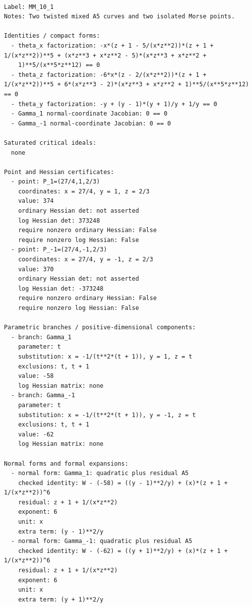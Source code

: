 \documentclass[10pt,a4paper]{article}
\begin{document}
\begin{lstlisting}

Label: MM_10_1
Notes: Two twisted mixed A5 curves and two isolated Morse points.

Identities / compact forms:
  - theta_x factorization: -x*(z + 1 - 5/(x*z**2))*(z + 1 + 1/(x*z**2))**5 + (x*z**3 + x*z**2 - 5)*(x*z**3 + x*z**2 +
    1)**5/(x**5*z**12) == 0
  - theta_z factorization: -6*x*(z - 2/(x*z**2))*(z + 1 + 1/(x*z**2))**5 + 6*(x*z**3 - 2)*(x*z**3 + x*z**2 + 1)**5/(x**5*z**12) == 0
  - theta_y factorization: -y + (y - 1)*(y + 1)/y + 1/y == 0
  - Gamma_1 normal-coordinate Jacobian: 0 == 0
  - Gamma_-1 normal-coordinate Jacobian: 0 == 0

Saturated critical ideals:
  none

Point and Hessian certificates:
  - point: P_1=(27/4,1,2/3)
    coordinates: x = 27/4, y = 1, z = 2/3
    value: 374
    ordinary Hessian det: not asserted
    log Hessian det: 373248
    require nonzero ordinary Hessian: False
    require nonzero log Hessian: False
  - point: P_-1=(27/4,-1,2/3)
    coordinates: x = 27/4, y = -1, z = 2/3
    value: 370
    ordinary Hessian det: not asserted
    log Hessian det: -373248
    require nonzero ordinary Hessian: False
    require nonzero log Hessian: False

Parametric branches / positive-dimensional components:
  - branch: Gamma_1
    parameter: t
    substitution: x = -1/(t**2*(t + 1)), y = 1, z = t
    exclusions: t, t + 1
    value: -58
    log Hessian matrix: none
  - branch: Gamma_-1
    parameter: t
    substitution: x = -1/(t**2*(t + 1)), y = -1, z = t
    exclusions: t, t + 1
    value: -62
    log Hessian matrix: none

Normal forms and formal expansions:
  - normal form: Gamma_1: quadratic plus residual A5
    checked identity: W - (-58) = ((y - 1)**2/y) + (x)*(z + 1 + 1/(x*z**2))^6
    residual: z + 1 + 1/(x*z**2)
    exponent: 6
    unit: x
    extra term: (y - 1)**2/y
  - normal form: Gamma_-1: quadratic plus residual A5
    checked identity: W - (-62) = ((y + 1)**2/y) + (x)*(z + 1 + 1/(x*z**2))^6
    residual: z + 1 + 1/(x*z**2)
    exponent: 6
    unit: x
    extra term: (y + 1)**2/y

\end{lstlisting}
\end{document}
